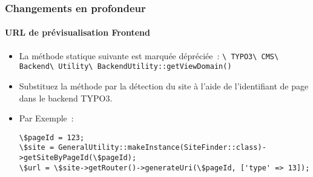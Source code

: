 
\begin{frame}[fragile]
	\frametitle{Changements en profondeur}
	\framesubtitle{URL de prévisualisation Frontend}

	\lstset{basicstyle=\tiny\ttfamily}

	\begin{itemize}
		\item La méthode statique suivante est marquée dépréciée~:\newline
			\smaller\texttt{\textbackslash
				TYPO3\textbackslash
				CMS\textbackslash
				Backend\textbackslash
				Utility\textbackslash
				BackendUtility::getViewDomain()}\normalsize

		\item Substituez la méthode par la détection du site à l'aide de l'identifiant de
			page dans le backend TYPO3.
		\item Par Exemple~:
\begin{lstlisting}
\$pageId = 123;
\$site = GeneralUtility::makeInstance(SiteFinder::class)->getSiteByPageId(\$pageId);
\$url = \$site->getRouter()->generateUri(\$pageId, ['type' => 13]);
\end{lstlisting}

	\end{itemize}

\end{frame}


